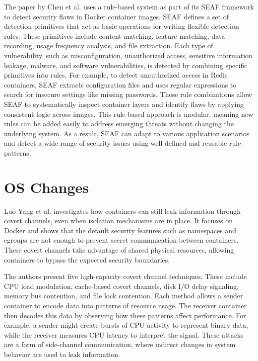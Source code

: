 \documentclass[12pt]{report}
\begin{document}
\begin{doublespace}
The paper by Chen et al. \cite{chen2022seaf} uses a rule-based system as part of its SEAF framework to detect security flaws in Docker container images. SEAF defines a set of detection primitives that act as basic operations for writing flexible detection rules. These primitives include content matching, feature matching, data recording, usage frequency analysis, and file extraction. Each type of vulnerability, such as misconfiguration, unauthorized access, sensitive information leakage, malware, and software vulnerabilities, is detected by combining specific primitives into rules. For example, to detect unauthorized access in Redis containers, SEAF extracts configuration files and uses regular expressions to search for insecure settings like missing passwords. These rule combinations allow SEAF to systematically inspect container layers and identify flaws by applying consistent logic across images. This rule-based approach is modular, meaning new rules can be added easily to address emerging threats without changing the underlying system. As a result, SEAF can adapt to various application scenarios and detect a wide range of security issues using well-defined and reusable rule patterns.

\section{OS Changes}

Luo Yang et al. \cite{luo2016whispers} investigates how containers can still leak information through covert channels, even when isolation mechanisms are in place. It focuses on Docker and shows that the default security features such as namespaces and cgroups are not enough to prevent secret communication between containers. These covert channels take advantage of shared physical resources, allowing containers to bypass the expected security boundaries.

The authors present five high-capacity covert channel techniques. These include CPU load modulation, cache-based covert channels, disk I/O delay signaling, memory bus contention, and file lock contention. Each method allows a sender container to encode data into patterns of resource usage. The receiver container then decodes this data by observing how these patterns affect performance. For example, a sender might create bursts of CPU activity to represent binary data, while the receiver measures CPU latency to interpret the signal. These attacks are a form of side-channel communication, where indirect changes in system behavior are used to leak information.


\end{doublespace}
\end{document}
